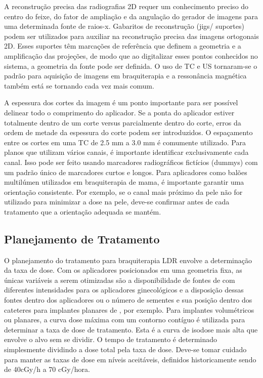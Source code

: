 \documentclass[11pt,a4paper]{article}
\newcounter{exemplo}
\begin{document}
	A reconstrução precisa das radiografias 2D requer um conhecimento preciso do centro do feixe, do fator de ampliação e da angulação do gerador de imagens para uma determinada fonte de raios-x. Gabaritos de reconstrução (jigs/ suportes) podem ser utilizados para auxiliar na reconstrução precisa das imagens ortogonais 2D. Esses suportes têm marcações de referência que definem a geometria e a amplificação das projeções, de modo que ao digitalizar esses pontos conhecidos no sistema, a geometria da fonte pode ser definida. O uso de TC e US tornaram-se o padrão para aquisição de imagens em braquiterapia e a ressonância magnética também está se tornando cada vez  mais comum.

	A espessura dos cortes da imagem é um ponto importante para ser possível delinear todo o comprimento do aplicador. Se a ponta do aplicador estiver totalmente dentro de um corte versus parcialmente dentro do corte, erros da ordem de metade da espessura do corte podem ser introduzidos. O espaçamento entre os cortes em uma TC de 2.5 mm a 3.0 mm é comumente utilizado. Para planos que utilizam vários canais, é importante identificar exclusivamente cada canal. Isso pode ser feito usando marcadores radiográficos fictícios (dummys) com um padrão único de marcadores curtos e longos. Para aplicadores como balões multilúmen utilizados em braquiterapia de mama, é importante garantir uma orientação consistente. Por exemplo, se o canal mais próximo da pele não for utilizado para minimizar a dose na pele, deve-se confirmar antes de cada tratamento que a orientação adequada se mantém.

\subsection*{Planejamento de Tratamento}

	O planejamento do tratamento para braquiterapia LDR envolve a determinação da taxa de dose. Com os aplicadores posicionados em uma geometria fixa, as únicas variáveis a serem otimizadas são a disponibilidade de fontes de  com diferentes intensidades para os aplicadores ginecológicos e a disposição dessas fontes dentro dos aplicadores ou o número de sementes e sua posição dentro dos cateteres para implantes planares de , por exemplo. Para implantes volumétricos ou planares, a curva dose máxima com um contorno contíguo é utilizada para determinar a taxa de dose de tratamento. Esta é a curva de isodose mais alta que envolve o alvo sem se dividir. O tempo de tratamento é determinado simplesmente dividindo a dose total pela taxa de dose. Deve-se tomar cuidado para manter as taxas de dose em níveis aceitáveis, definidos historicamente sendo de 40cGy/h a 70 cGy/hora.
\end{document}
